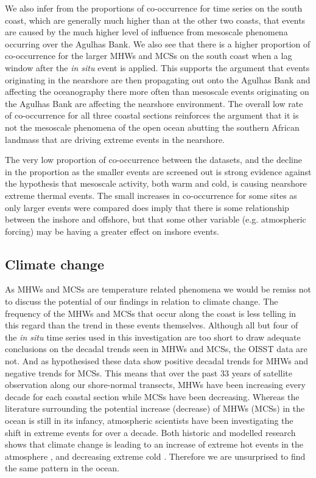 \documentclass[a4paper,10pt,review]{elsarticle}
\begin{document}
We also infer from the proportions of co-occurrence for time series on the south coast, which are generally much higher than at the other two coasts, that events are caused by the much higher level of influence from mesoscale phenomena occurring over the Agulhas Bank. We also see that there is a higher proportion of co-occurrence for the larger MHWs and MCSs on the south coast when a lag window after the \emph{in situ} event is applied. This supports the argument that events originating in the nearshore are then propagating out onto the Agulhas Bank and affecting the oceanography there more often than mesoscale events originating on the Agulhas Bank are affecting the nearshore environment. The overall low rate of co-occurrence for all three coastal sections reinforces the argument that it is not the mesoscale phenomena of the open ocean abutting the southern African landmass that are driving extreme events in the nearshore.

The very low proportion of co-occurrence between the datasets, and the decline in the proportion as the smaller events are screened out is strong evidence against the hypothesis that mesoscale activity, both warm and cold, is causing nearshore extreme thermal events. The small increases in co-occurrence for some sites as only larger events were compared does imply that there is some relationship between the inshore and offshore, but that some other variable (e.g. atmospheric forcing) may be having a greater effect on inshore events.

\subsection{Climate change}
As MHWs and MCSs are temperature related phenomena we would be remiss not to discuss the potential of our findings in relation to climate change. The frequency of the MHWs and MCSs that occur along the coast is less telling in this regard than the trend in these events themselves. Although all but four of the \emph{in situ} time series used in this investigation are too short to draw adequate conclusions on the decadal trends seen in MHWs and MCSs, the OISST data are not. And as hypothesised these data show positive decadal trends for MHWs and negative trends for MCSs. This means that over the past 33 years of satellite observation along our shore-normal transects, MHWs have been increasing every decade for each coastal section while MCSs have been decreasing. Whereas the literature surrounding the potential increase (decrease) of MHWs (MCSs) in the ocean is still in its infancy, atmospheric scientists have been investigating the shift in extreme events for over a decade. Both historic and modelled research shows that climate change is leading to an increase of extreme hot events in the atmosphere \citep{Easterling2000, Perkins2013}, and decreasing extreme cold \citep{Meehl2004}. Therefore we are unsurprised to find the same pattern in the ocean.
\end{document}
